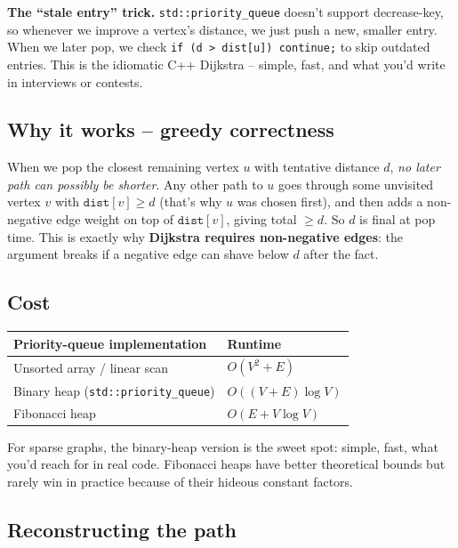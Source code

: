 \documentclass[11pt]{article}
\begin{document}
\begin{warnbox}
\textbf{The ``stale entry'' trick.} \texttt{std::priority\_queue} doesn't support decrease-key, so whenever we improve a vertex's distance, we just push a new, smaller entry. When we later pop, we check \texttt{if (d > dist[u]) continue;} to skip outdated entries. This is the idiomatic C++ Dijkstra -- simple, fast, and what you'd write in interviews or contests.
\end{warnbox}

\subsection*{Why it works -- greedy correctness}

\begin{ideabox}
When we pop the closest remaining vertex $u$ with tentative distance $d$, \emph{no later path can possibly be shorter}. Any other path to $u$ goes through some unvisited vertex $v$ with $\texttt{dist}[v] \geq d$ (that's why $u$ was chosen first), and then adds a non-negative edge weight on top of $\texttt{dist}[v]$, giving total $\geq d$. So $d$ is final at pop time. This is exactly why \textbf{Dijkstra requires non-negative edges}: the argument breaks if a negative edge can shave below $d$ after the fact.
\end{ideabox}

\subsection*{Cost}

\begin{center}
\begin{tabular}{ll}
\hline
Priority-queue implementation & Runtime \\
\hline
Unsorted array / linear scan & $O(V^2 + E)$ \\
Binary heap (\texttt{std::priority\_queue}) & $O((V + E) \log V)$ \\
Fibonacci heap & $O(E + V \log V)$ \\
\hline
\end{tabular}
\end{center}

For sparse graphs, the binary-heap version is the sweet spot: simple, fast, what you'd reach for in real code. Fibonacci heaps have better theoretical bounds but rarely win in practice because of their hideous constant factors.

\subsection*{Reconstructing the path}
\end{document}

